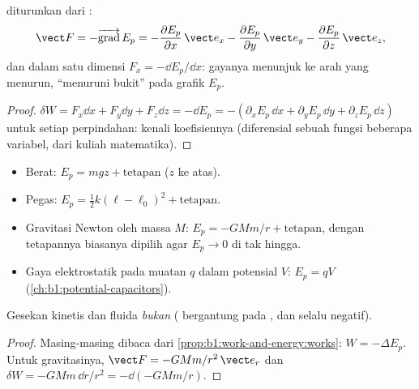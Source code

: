 \begin{proposition}\label{prop:b1:work-and-energy:gradient}
 diturunkan dari :
\[
\vect F = -\overrightarrow{\operatorname{grad}}\,E_p
= -\frac{\partial E_p}{\partial x}\,\vect e_x
- \frac{\partial E_p}{\partial y}\,\vect e_y
- \frac{\partial E_p}{\partial z}\,\vect e_z ,
\]
dan dalam satu dimensi $F_x = -\dd E_p/\dd x$: gayanya menunjuk ke arah
 yang menurun, ``menuruni bukit'' pada grafik $E_p$.
\end{proposition}

\begin{proof}
$\delta W = F_x\dd x + F_y\dd y + F_z\dd z = -\dd E_p = -(\partial_xE_p\,\dd x
+ \partial_yE_p\,\dd y + \partial_zE_p\,\dd z)$ untuk setiap perpindahan:
kenali koefisiennya (diferensial sebuah fungsi beberapa variabel, dari
kuliah matematika).
\end{proof}

\begin{proposition}\label{prop:b1:work-and-energy:eps}
\begin{itemize}
  \item Berat: $E_p = mgz + \text{tetapan}$ ($z$ ke atas).
  \item Pegas: $E_p = \tfrac12 k(\ell - \ell_0)^2 + \text{tetapan}$.
  \item Gravitasi Newton oleh massa $M$: $E_p = -GMm/r + \text{tetapan}$,
        dengan tetapannya biasanya dipilih agar $E_p \to 0$ di tak hingga.
  \item Gaya elektrostatik pada muatan $q$ dalam potensial $V$:
        $E_p = qV$ (\cref{ch:b1:potential-capacitors}).
\end{itemize}
Gesekan kinetis dan  fluida \emph{bukan} 
( bergantung pada , dan selalu negatif).
\end{proposition}

\begin{proof}
Masing-masing dibaca dari  \cref{prop:b1:work-and-energy:works}:
$W = -\Delta E_p$. Untuk gravitasinya, $\vect F = -GMm/r^2\,\vect e_r$ dan
$\delta W = -GMm\,\dd r/r^2 = -\dd(-GMm/r)$.
\end{proof}

